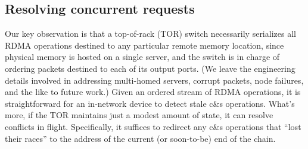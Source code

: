 




\subsection{Resolving concurrent requests}

Our key observation is that a top-of-rack (TOR) switch necessarily
serializes all RDMA operations destined to any particular remote memory
location, since physical memory is hosted on a single server, and the
switch is in charge of ordering packets destined to each of its output
ports.  (We leave the engineering details involved in addressing
multi-homed servers, corrupt packets, node failures, and the like to
future work.)  Given an ordered stream of RDMA operations, it is
straightforward for an in-network device to detect stale c\&s
operations.  What's more, if the TOR maintains just a modest amount of
state, it can resolve conflicts in flight.  Specifically, it suffices
to redirect any c\&s operations that ``lost their races'' to the
address of the current (or soon-to-be) end of the chain.

